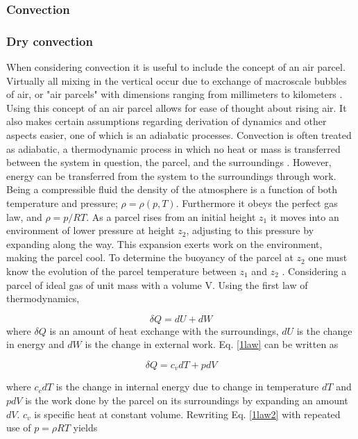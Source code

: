 \subsubsection{Convection}

\subsubsection{Dry convection}

When considering convection it is useful to include the concept of an air parcel. Virtually all mixing in the vertical occur due to exchange of macroscale bubbles of air, or "air parcels" with dimensions ranging from millimeters to kilometers \cite{Wallace}. Using this concept of an air parcel allows for ease of thought about rising air. It also makes certain assumptions regarding derivation of dynamics and other aspects easier, one of which is an adiabatic processes. Convection is often treated as adiabatic, a thermodynamic process in which no heat or mass is transferred between the system in question, the parcel, and the surroundings \cite{Wallace}. However, energy can be transferred from the system to the surroundings through work. Being a compressible fluid the density of the atmosphere is a function of both temperature and pressure; $\rho = \rho(p,T)$. Furthermore it obeys the perfect gas law, and $\rho = p/RT$. As a parcel rises from an initial height $z_1$ it moves into an environment of lower pressure at height $z_2$, adjusting to this pressure by expanding along the way. This expansion exerts work on the environment, making the parcel cool. To determine the buoyancy of the parcel at $z_2$ one must know the evolution of the parcel temperature between $z_1$ and $z_2$ \cite{Marshall}. Considering a parcel of ideal gas of unit mass with a volume V. Using the first law of thermodynamics,

\begin{equation}
    \delta Q = dU + dW
    \label{1law}
\end{equation}
where $\delta Q$ is an amount of heat exchange with the surroundings, $dU$ is the change in energy and $dW$ is the change in external work. Eq. \eqref{1law} can be written as 

\begin{equation}
    \delta Q = c_vdT + pdV
    \label{1law2}
\end{equation}

where $c_cdT$ is the change in internal energy due to change in temperature $dT$ and $pdV$ is the work done by the parcel on its surroundings by expanding an amount $dV$. $c_v$ is specific heat at constant volume. Rewriting Eq. \eqref{1law2} with repeated use of $p=\rho RT$ yields 

